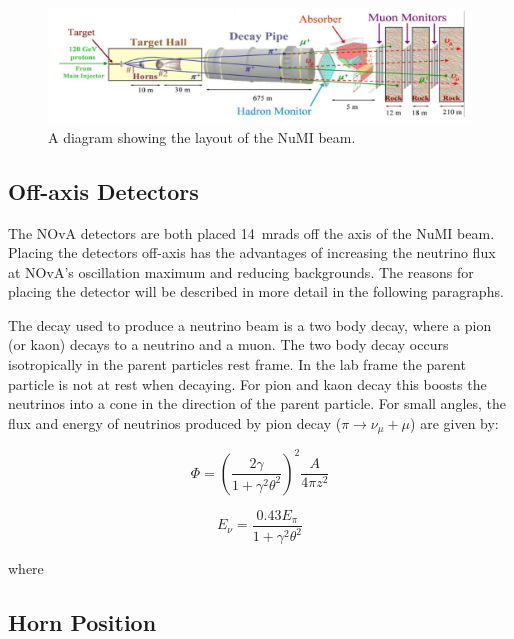 \begin{figure}
  \centering
  \includegraphics[width=1\textwidth]{../../img/beam/beam_diagram.png}
  \caption{A diagram showing the layout of the NuMI beam.}
  \label{fig:NuMI}
\end{figure}


\subsection{Off-axis Detectors}

The NOvA detectors are both placed 14~mrads off the axis of the NuMI
beam. Placing the detectors off-axis has the advantages of increasing
the neutrino flux at NOvA's oscillation maximum and reducing
backgrounds.  The reasons for placing the detector will be described
in more detail in the following paragraphs. 

The decay used to produce a neutrino beam is a two body decay, where a
pion (or kaon) decays to a neutrino and a muon. The two body decay
occurs isotropically in the parent particles rest frame. 
In the lab frame the parent particle is not at rest when decaying. For
pion and kaon decay this boosts the neutrinos into a cone in the
direction of the parent particle.
For small angles, the flux and energy of neutrinos produced by pion
decay ($\pi \rightarrow \nu_{\mu} + \mu$) are given by:

\begin{equation}
\Phi = \left( \dfrac{2\gamma}{1+\gamma^2 \theta^2} \right)^2 \dfrac{A}{4\pi z^2}
\label{eqn:NuPiFlux}
\end{equation}

\begin{equation}
E_{\nu} = \dfrac{0.43E_{\pi}}{1+\gamma^2\theta^2}
\label{eqn:NuPiEnrgy}
\end{equation}

where 


\subsection{Horn Position}


